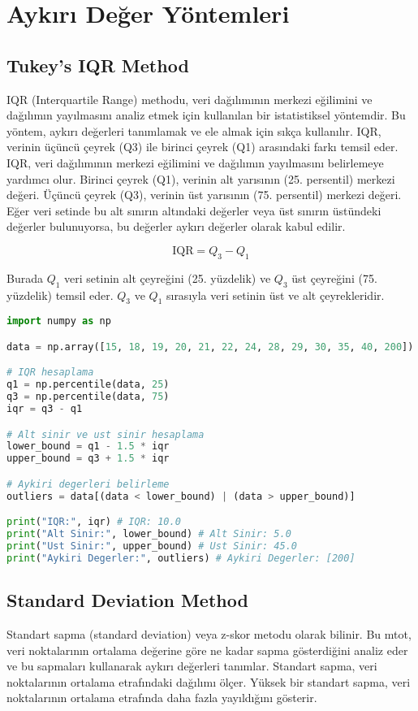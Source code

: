 \section{Aykırı Değer Yöntemleri}

\subsection{Tukey's IQR Method}
IQR (Interquartile Range) methodu, veri dağılımının merkezi eğilimini ve dağılımın yayılmasını analiz etmek için kullanılan bir istatistiksel yöntemdir. Bu yöntem, aykırı değerleri tanımlamak ve ele almak için sıkça kullanılır. IQR, verinin üçüncü çeyrek (Q3) ile birinci çeyrek (Q1) arasındaki farkı temsil eder. IQR, veri dağılımının merkezi eğilimini ve dağılımın yayılmasını belirlemeye yardımcı olur. Birinci çeyrek (Q1), verinin alt yarısının (25. persentil) merkezi değeri. Üçüncü çeyrek (Q3), verinin üst yarısının (75. persentil) merkezi değeri. Eğer veri setinde bu alt sınırın altındaki değerler veya üst sınırın üstündeki değerler bulunuyorsa, bu değerler aykırı değerler olarak kabul edilir.

\[ \text{IQR} = Q_3 - Q_1 \]

Burada $Q_1$ veri setinin alt çeyreğini (25. yüzdelik) ve $Q_3$ üst çeyreğini (75. yüzdelik) temsil eder. $Q_3$ ve $Q_1$ sırasıyla veri setinin üst ve alt çeyrekleridir.

\begin{lstlisting}[language=Python]
import numpy as np

data = np.array([15, 18, 19, 20, 21, 22, 24, 28, 29, 30, 35, 40, 200])

# IQR hesaplama
q1 = np.percentile(data, 25)
q3 = np.percentile(data, 75)
iqr = q3 - q1

# Alt sinir ve ust sinir hesaplama
lower_bound = q1 - 1.5 * iqr
upper_bound = q3 + 1.5 * iqr

# Aykiri degerleri belirleme
outliers = data[(data < lower_bound) | (data > upper_bound)]

print("IQR:", iqr) # IQR: 10.0
print("Alt Sinir:", lower_bound) # Alt Sinir: 5.0
print("Ust Sinir:", upper_bound) # Ust Sinir: 45.0
print("Aykiri Degerler:", outliers) # Aykiri Degerler: [200]
\end{lstlisting}

\subsection{Standard Deviation Method}
Standart sapma (standard deviation) veya z-skor metodu olarak bilinir. Bu mtot, veri noktalarının ortalama değerine göre ne kadar sapma gösterdiğini analiz eder ve bu sapmaları kullanarak aykırı değerleri tanımlar. Standart sapma, veri noktalarının ortalama etrafındaki dağılımı ölçer. Yüksek bir standart sapma, veri noktalarının ortalama etrafında daha fazla yayıldığını gösterir.

